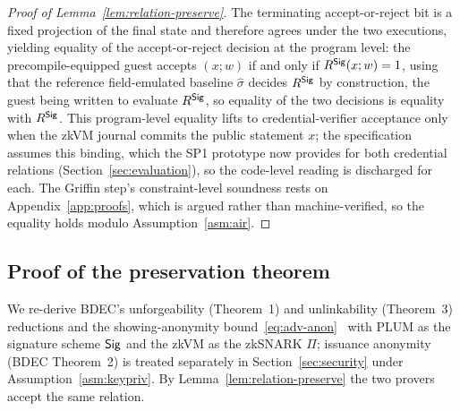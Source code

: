 \begin{proof}[Proof of Lemma~\ref{lem:relation-preserve}]
The terminating accept-or-reject bit is a fixed projection of the final state and therefore agrees under the two executions, yielding equality of the accept-or-reject decision at the program level: the precompile-equipped guest accepts $(x;w)$ if and only if $R^{\mathsf{Sig}}(x;w)=1$, using that the reference field-emulated baseline $\hat\sigma$ decides $R^{\mathsf{Sig}}$ by construction, the guest being written to evaluate $R^{\mathsf{Sig}}$, so equality of the two decisions is equality with $R^{\mathsf{Sig}}$. This program-level equality lifts to credential-verifier acceptance only when the zkVM journal commits the public statement $x$; the specification assumes this binding, which the SP1 prototype now provides for both credential relations (Section~\ref{sec:evaluation}), so the code-level reading is discharged for each. The Griffin step's constraint-level soundness rests on Appendix~\ref{app:proofs}, which is argued rather than machine-verified, so the equality holds modulo Assumption~\ref{asm:air}.
\end{proof}

\subsection{Proof of the preservation theorem}\label{app:prsv-thm}
We re-derive BDEC's unforgeability (Theorem~1) and unlinkability (Theorem~3) reductions and the showing-anonymity bound~\eqref{eq:adv-anon}~\cite{10.1007/978-981-96-0957-4_3} with PLUM as the signature scheme $\mathsf{Sig}$ and the zkVM as the zkSNARK $\Pi$; issuance anonymity (BDEC Theorem~2) is treated separately in Section~\ref{sec:security} under Assumption~\ref{asm:keypriv}. By Lemma~\ref{lem:relation-preserve} the two provers accept the same relation.

